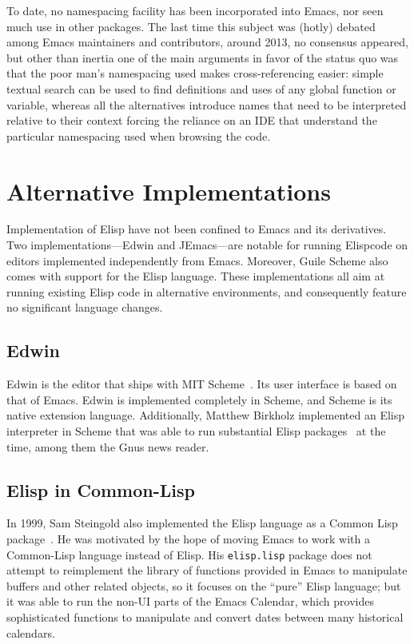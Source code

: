 \documentclass[format=acmsmall, review=false, screen=true]{acmart}
\newcommand \Elisp {Elisp}
\begin{document}
To date, no namespacing facility has been incorporated into Emacs, nor seen
much use in other packages.  The last time this subject was (hotly) debated
among Emacs maintainers and contributors, around 2013, no consensus
appeared, but other than inertia one of the main arguments in favor of the
status quo was that the poor man's namespacing used makes cross-referencing
easier: simple textual search can be used to find definitions and uses of
any global function or variable, whereas all the alternatives introduce
names that need to be interpreted relative to their context forcing the
reliance on an IDE that understand the particular namespacing
used when browsing the code.



\section{Alternative Implementations}
\label{sec:alternative-implementations}

Implementation of \Elisp{} have not been confined to Emacs and its
derivatives.  Two implementations---Edwin and JEmacs---are notable for
running \Elisp code on editors implemented independently from
Emacs.  Moreover, Guile Scheme also comes with support for the \Elisp{}
language.  These implementations all aim at running existing \Elisp{}
code in alternative environments, and consequently feature no
significant language changes.

\subsection{Edwin}

Edwin is the editor that ships with MIT Scheme~\cite{MITScheme2014}.
Its user interface is based on that of Emacs.  Edwin is implemented
completely in Scheme, and Scheme is its native extension language.
Additionally, Matthew Birkholz implemented an \Elisp{} interpreter
in Scheme that was able to run substantial \Elisp{}
packages~\cite{Birkholz1993} at the time, among them the Gnus news reader.

\subsection{Elisp in Common-Lisp}

In 1999, Sam Steingold also implemented the \Elisp{} language as a Common
Lisp package~\cite{Steingold99}.  He was motivated by the hope of moving
Emacs to work with a Common-Lisp language instead of \Elisp{}.
His \texttt{elisp.lisp} package does not attempt to reimplement the library
of functions provided in Emacs to manipulate buffers and other related
objects, so it focuses on the ``pure'' \Elisp{} language; but it was able to
run the non-UI parts of the Emacs Calendar, which provides sophisticated
functions to manipulate and convert dates between many historical calendars.
\end{document}

